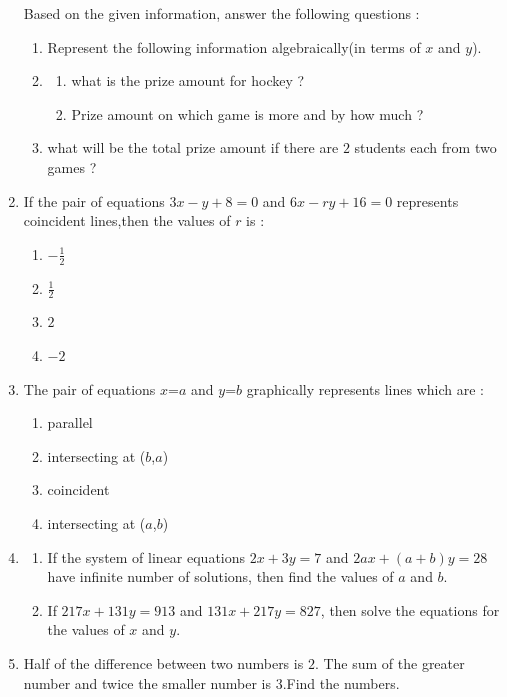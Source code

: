 \documentclass[12pt,-letter paper]{article}
\begin{document}
\begin{enumerate}
Based on the given information, answer the following questions :
\begin{enumerate}[label=(\roman*)]
    \item Represent the following information algebraically(in terms of $x$ and $y$).
    \item\begin{enumerate}[label=(\alph*)]
\item what is the prize amount for hockey ?
\item Prize amount on which game is more and by how much ?
    \end{enumerate}
    \item what will be the total prize amount if there are $2$ students each from two games ?
\end{enumerate}
\pagebreak
\item If the pair of equations $3x - y + 8 = 0$ and $6x - ry +16 =0$ represents coincident lines,then the values of $r$ is :
\begin{enumerate}[label=(\alph*)]
    \item $-\frac{1}{2}$
    \item $\frac{1}{2}$
    \item $2$
    \item $-2$
\end{enumerate}
\item The pair of equations $x$=$a$ and $y$=$b$ graphically represents lines which are :
\begin{enumerate}[label=(\alph*)]
    \item parallel
    \item intersecting at ($b$,$a$)
    \item coincident
    \item intersecting at ($a$,$b$)  
\end{enumerate}
\item
\begin{enumerate}[label=(\alph*)]
\item If the system of linear equations 
$2x + 3y = 7$  and   $2ax +(a + b)y =28$ 
have infinite number of solutions, then find the values of $a$ and $b$.
\item  If $217x + 131y = 913$ and  
$131x + 217y = 827$,  then solve the equations for the values of $x$ and $y$.
\end{enumerate}
\item Half of the difference between two numbers is $2$. The sum of the greater number and twice the smaller number is $3$.Find the numbers.

\end{enumerate}
\end{document}
